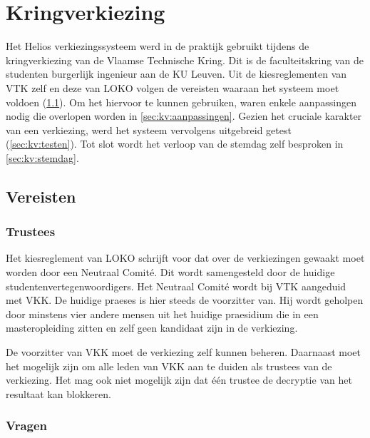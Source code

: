 %
%

\chapter{Kringverkiezing}
\label{chap:kringverkiezing}

Het Helios verkiezingssysteem werd in de praktijk gebruikt tijdens de kringverkiezing van de Vlaamse Technische Kring. Dit is de faculteitskring van de studenten burgerlijk ingenieur aan de KU Leuven. Uit de kiesreglementen van VTK zelf en deze van LOKO volgen de vereisten waaraan het systeem moet voldoen (\ref{sec:kv:vereisten}). Om het hiervoor te kunnen gebruiken, waren enkele aanpassingen nodig die overlopen worden in \ref{sec:kv:aanpassingen}. Gezien het cruciale karakter van een verkiezing, werd het systeem vervolgens uitgebreid getest (\ref{sec:kv:testen}). Tot slot wordt het verloop van de stemdag zelf besproken in \ref{sec:kv:stemdag}.

\section[Vereisten]{Vereisten~\cite{loko_kiesreglement_verkiezingen}\cite{vtk_verkiezingsreglement}}
\label{sec:kv:vereisten}

\subsection{Trustees}

Het kiesreglement van LOKO schrijft voor dat over de verkiezingen gewaakt moet worden door een Neutraal Comit\'e. Dit wordt samengesteld door de huidige studentenvertegenwoordigers. Het Neutraal Comit\'e wordt bij VTK aangeduid met VKK. De huidige praeses is hier steeds de voorzitter van. Hij wordt geholpen door minstens vier andere mensen uit het huidige praesidium die in een masteropleiding zitten en zelf geen kandidaat zijn in de verkiezing.

\npar De voorzitter van VKK moet de verkiezing zelf kunnen beheren. Daarnaast moet het mogelijk zijn om alle leden van VKK aan te duiden als trustees van de verkiezing. Het mag ook niet mogelijk zijn dat \'e\'en trustee de decryptie van het resultaat kan blokkeren.

\subsection{Vragen}

